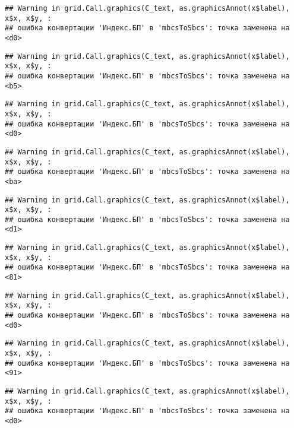 \documentclass[
]{article}
\begin{document}
\begin{verbatim}
## Warning in grid.Call.graphics(C_text, as.graphicsAnnot(x$label), x$x, x$y, :
## ошибка конвертации 'Индекс.БП' в 'mbcsToSbcs': точка заменена на <d0>
\end{verbatim}

\begin{verbatim}
## Warning in grid.Call.graphics(C_text, as.graphicsAnnot(x$label), x$x, x$y, :
## ошибка конвертации 'Индекс.БП' в 'mbcsToSbcs': точка заменена на <b5>
\end{verbatim}

\begin{verbatim}
## Warning in grid.Call.graphics(C_text, as.graphicsAnnot(x$label), x$x, x$y, :
## ошибка конвертации 'Индекс.БП' в 'mbcsToSbcs': точка заменена на <d0>
\end{verbatim}

\begin{verbatim}
## Warning in grid.Call.graphics(C_text, as.graphicsAnnot(x$label), x$x, x$y, :
## ошибка конвертации 'Индекс.БП' в 'mbcsToSbcs': точка заменена на <ba>
\end{verbatim}

\begin{verbatim}
## Warning in grid.Call.graphics(C_text, as.graphicsAnnot(x$label), x$x, x$y, :
## ошибка конвертации 'Индекс.БП' в 'mbcsToSbcs': точка заменена на <d1>
\end{verbatim}

\begin{verbatim}
## Warning in grid.Call.graphics(C_text, as.graphicsAnnot(x$label), x$x, x$y, :
## ошибка конвертации 'Индекс.БП' в 'mbcsToSbcs': точка заменена на <81>
\end{verbatim}

\begin{verbatim}
## Warning in grid.Call.graphics(C_text, as.graphicsAnnot(x$label), x$x, x$y, :
## ошибка конвертации 'Индекс.БП' в 'mbcsToSbcs': точка заменена на <d0>
\end{verbatim}

\begin{verbatim}
## Warning in grid.Call.graphics(C_text, as.graphicsAnnot(x$label), x$x, x$y, :
## ошибка конвертации 'Индекс.БП' в 'mbcsToSbcs': точка заменена на <91>
\end{verbatim}

\begin{verbatim}
## Warning in grid.Call.graphics(C_text, as.graphicsAnnot(x$label), x$x, x$y, :
## ошибка конвертации 'Индекс.БП' в 'mbcsToSbcs': точка заменена на <d0>
\end{verbatim}
\end{document}
